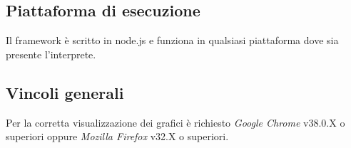 \subsection{Piattaforma di esecuzione}
Il framework è scritto in node.js e funziona in qualsiasi piattaforma dove sia presente l'interprete.

\subsection{Vincoli generali}
Per la corretta visualizzazione dei grafici è richiesto \emph{Google Chrome} v38.0.X o superiori oppure \emph{Mozilla Firefox} v32.X o superiori.
